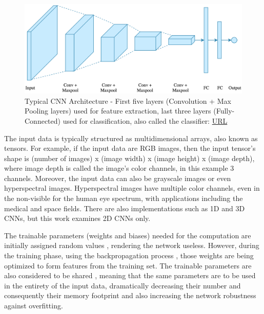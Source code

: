 \begin{figure} [H]
	\centering
	\includegraphics[width=\textwidth]{Images/typical-cnn-architecture.png}
	\decoRule
	\caption[Typical CNN Architecture]{Typical CNN Architecture - First five layers (Convolution + Max Pooling layers) used for feature extraction, last three layers (Fully-Connected) used for classification, also called the classifier: \href{https://www.kaggle.com/mauddib/digit-recogniser-tutorial-using-a-cnn-tensorflow}{URL}}
	\label{fig:typical-cnn-architecture}
\end{figure}

The input data is typically structured as multidimensional arrays, also known as tensors. For example, if the input data are RGB images, then the input tensor's shape is (number of images) x (image width) x (image height) x (image depth), where image depth is called the image's color channels, in this example 3 channels. Moreover, the input data can also be grayscale images or even hyperspectral images. Hyperspectral images have multiple color channels, even in the non-visible for the human eye spectrum, with applications including the medical and space fields. There are also implementations such as 1D and 3D CNNs, but this work examines 2D CNNs only.

The trainable parameters (weights and biases) needed for the computation are initially assigned random values \cite{Practical-recommendations-for-gradient-based-training-of-deep-architectures}, rendering the network useless. However, during the training phase, using the backpropagation process \cite{Learning-internal-representations-by-error-propagation}, those weights are being optimized to form features from the training set. The trainable parameters are also considered to be shared \cite{Generalization-and-network-design-strategies}, meaning that the same parameters are to be used in the entirety of the input data, dramatically decreasing their number and consequently their memory footprint and also increasing the network robustness against overfitting.

